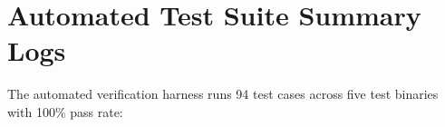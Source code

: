 \section{Automated Test Suite Summary Logs}
\label{app:logs}

The automated verification harness runs 94 test cases across five test binaries with 100\% pass rate:




